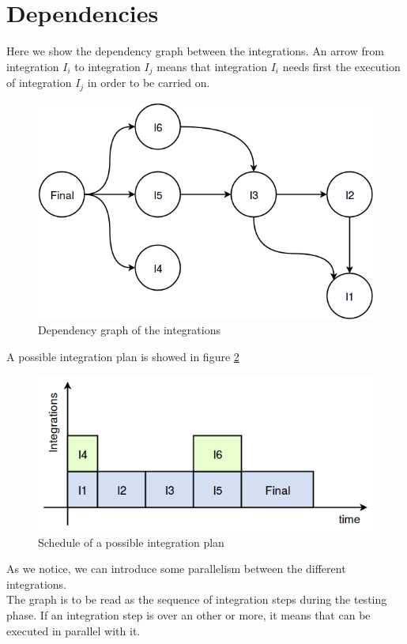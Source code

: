 \section{Dependencies}
Here we show the dependency graph between the integrations. An arrow from integration $I_i$ to integration $I_j$ means that integration $I_i$ needs first the execution of integration $I_j$ in order to be carried on.
\begin{figure}[H]
	\centering
	\includegraphics[scale = 0.5]{"../Analysis Documents/Dependencies"}
	\caption{Dependency graph of the integrations}
	\label{fig:dependency}
\end{figure}

A possible integration plan is showed in figure \ref{fig:schedule}
\begin{figure}[H]
	\centering
	\includegraphics[scale = 0.6]{"../Analysis Documents/schedule"}
	\caption{Schedule of a possible integration plan}
	\label{fig:schedule}
\end{figure}
As we notice, we can introduce some parallelism between the different integrations.\\The graph is to be read as the sequence of integration steps during the testing phase. If an integration step is over an other or more, it means that can be executed in parallel with it.